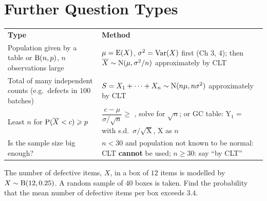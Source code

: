 \section{Further Question Types}
\begin{center}\renewcommand{\arraystretch}{1.12}\footnotesize
\begin{tabular}{|L{4.6cm}|L{10.6cm}|}\hline
\textbf{Type} & \textbf{Method}\\\Xhline{2pt}
Population given by a table or $\mathrm{B}(n,p)$, $n$ observations large & $\mu=\mathrm{E}(X)$, $\sigma^{2}=\mathrm{Var}(X)$ first (Ch 3, 4); then $\overline{X}\sim\mathrm{N}(\mu,\sigma^{2}/n)$ approximately by CLT\\\hline
Total of many independent counts (e.g.\ defects in $100$ batches) & $S=X_{1}+\cdots+X_{n}\sim\mathrm{N}(n\mu,n\sigma^{2})$ approximately by CLT\\\hline
Least $n$ for $\mathrm{P}(\overline{X}<c)\geqslant p$ & $\dfrac{c-\mu}{\sigma/\sqrt{n}}\geqslant$ , solve for $\sqrt n$; or GC table: $\mathrm{Y}_{1}=$  with s.d.\ $\sigma/\sqrt{\mathrm{X}}$, X as $n$\\\hline
Is the sample size big enough? & $n<30$ and population not known to be normal: CLT \textbf{cannot} be used; $n\geqslant30$: say ``by CLT''\\\hline
\end{tabular}\end{center}
\noindent\begin{minipage}[t]{0.48\textwidth}
\exlab The number of defective items, $X$, in a box of $12$ items is modelled by $X\sim\mathrm{B}(12,0.25)$. A random sample of $40$ boxes is taken. Find the probability that the mean number of defective items per box exceeds $3.4$.
\end{minipage}\hfill
